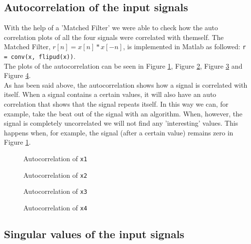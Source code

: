 \documentclass[final]{scrreprt} %
\begin{document}
\subsection{Autocorrelation of the input signals}

With the help of a 'Matched Filter' we were able to check how the auto correlation plots of all the four signals were correlated with themself.
The Matched Filter, $r[n]=x[n]*x[-n]$, is implemented in Matlab as followed: \texttt{r = conv(x, flipud(x))}.
\\
The plots of the autocorrelation can be seen in Figure \ref{fig:auto1}, Figure \ref{fig:auto2}, Figure \ref{fig:auto3} and Figure \ref{fig:auto4}.
\\
As has been said above, the autocorrelation shows how a signal is correlated with itself. 
When a signal contains a certain values, it will also have an auto correlation that shows that the signal repeats itself.
In this way we can, for example, take the beat out of the signal with an algorithm.
When, however, the signal is completely uncorrelated we will not find any 'interesting' values.
This happens when, for example, the signal (after a certain value) remains zero in Figure \ref{fig:auto1}.


\begin{figure}[H]
	\centering
    	\setlength\figureheight{6cm}
    	\setlength\figurewidth{10cm}
    	    	
    	\caption{Autocorrelation of \texttt{x1}}
    	\label{fig:auto1}
\end{figure}
\begin{figure}[H]
	\centering
    	\setlength\figureheight{6cm}
    	\setlength\figurewidth{10cm}
    	    	
    	\caption{Autocorrelation of \texttt{x2}}
    	\label{fig:auto2}
\end{figure}
\begin{figure}[H]
	\centering
    	\setlength\figureheight{6cm}
    	\setlength\figurewidth{10cm}
    	    	
    	\caption{Autocorrelation of \texttt{x3}}
    	\label{fig:auto3}
\end{figure}
\begin{figure}[H]
	\centering
    	\setlength\figureheight{6cm}
    	\setlength\figurewidth{10cm}
    	    	
    	\caption{Autocorrelation of \texttt{x4}}
    	\label{fig:auto4}
\end{figure}

\subsection{Singular values of the input signals}
\end{document}

